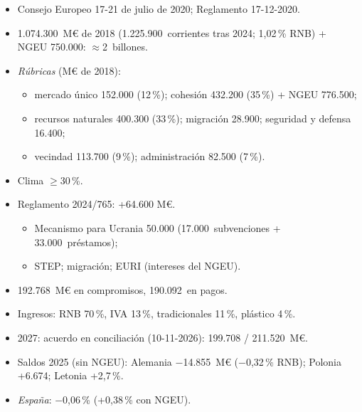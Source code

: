 \documentclass{article}
\begin{document}
\begin{columnas}
\begin{itemize}
\item Consejo Europeo 17-21 de julio de 2020; Reglamento 17-12-2020.
\item 1.074.300~M€ de 2018 (1.225.900~corrientes tras 2024; 1,02\,\% RNB) + NGEU 750.000: $\approx$2~billones.
\item \emph{Rúbricas} (M€ de 2018):
  \begin{itemize}
  \item mercado único 152.000 (12\,\%); cohesión 432.200 (35\,\%) + NGEU 776.500;
  \item recursos naturales 400.300 (33\,\%); migración 28.900; seguridad y defensa 16.400;
  \item vecindad 113.700 (9\,\%); administración 82.500 (7\,\%).
  \end{itemize}
\item Clima $\geq$30\,\%.
\end{itemize}
\begin{itemize}
\item Reglamento 2024/765: +64.600 M€.
  \begin{itemize}
  \item Mecanismo para Ucrania 50.000 (17.000~subvenciones + 33.000~préstamos);
  \item STEP; migración; EURI (intereses del NGEU).
  \end{itemize}
\end{itemize}
\begin{itemize}
\item 192.768~M€ en compromisos, 190.092~en pagos.
\item Ingresos: RNB 70\,\%, IVA 13\,\%, tradicionales 11\,\%, plástico 4\,\%.
\item 2027: acuerdo en conciliación (10-11-2026): 199.708 / 211.520~M€.
\end{itemize}
\begin{itemize}
\item Saldos 2025 (sin NGEU): Alemania $-$14.855~M€ ($-$0,32\,\% RNB); Polonia +6.674; Letonia +2,7\,\%.
\item \emph{España}: $-$0,06\,\% (+0,38\,\% con NGEU).
\end{itemize}

\end{columnas}
\end{document}
